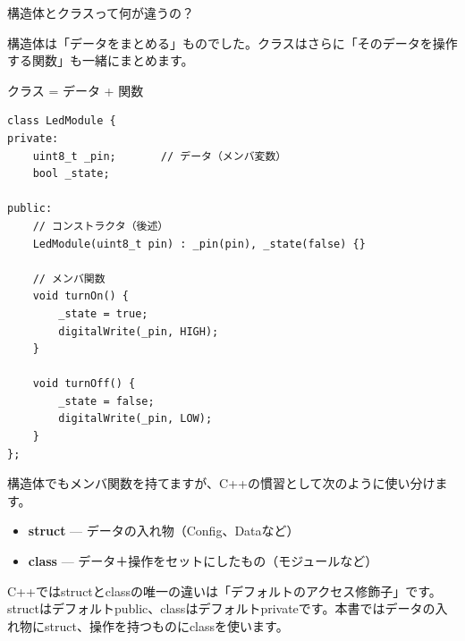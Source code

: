 \begin{qabox}{構造体とクラスって何が違うの？}

構造体は「データをまとめる」ものでした。クラスはさらに「そのデータを操作する関数」も一緒にまとめます。

\begin{goodexample}{クラス = データ + 関数}
\begin{lstlisting}
class LedModule {
private:
    uint8_t _pin;       // データ（メンバ変数）
    bool _state;

public:
    // コンストラクタ（後述）
    LedModule(uint8_t pin) : _pin(pin), _state(false) {}

    // メンバ関数
    void turnOn() {
        _state = true;
        digitalWrite(_pin, HIGH);
    }

    void turnOff() {
        _state = false;
        digitalWrite(_pin, LOW);
    }
};
\end{lstlisting}
\end{goodexample}

構造体でもメンバ関数を持てますが、C++の慣習として次のように使い分けます。

\begin{itemize}
  \item \textbf{struct} — データの入れ物（Config、Dataなど）
  \item \textbf{class} — データ＋操作をセットにしたもの（モジュールなど）
\end{itemize}

\begin{notebox}[structとclassの技術的な違い]
C++ではstructとclassの唯一の違いは「デフォルトのアクセス修飾子」です。structはデフォルトpublic、classはデフォルトprivateです。本書ではデータの入れ物にstruct、操作を持つものにclassを使います。
\end{notebox}

\end{qabox}


